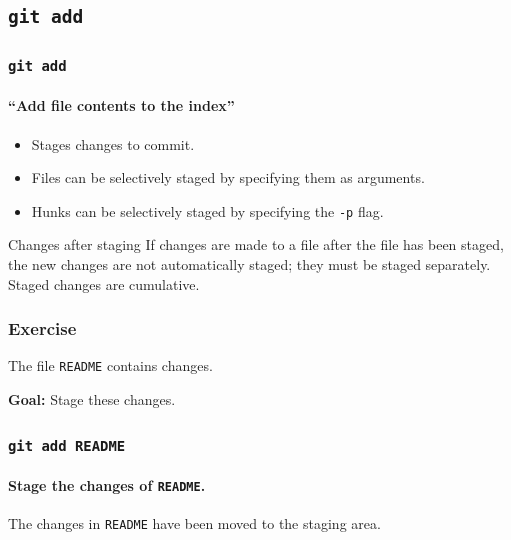 \documentclass{beamer}
\newcommand\gitcmd[1]{\texttt{git #1}}
\newcommand\gflag[1]{\texttt{#1}}
\newcommand\goal[1]{\textbf{Goal:} #1}
\begin{document}
\subsection{\gitcmd{add}}

\begin{frame}
  \frametitle{\gitcmd{add}}
  \framesubtitle{``Add file contents to the index''}
  \begin{itemize}
    \item Stages changes to commit.
    \item Files can be selectively staged by specifying them as arguments.
    \item Hunks can be selectively staged by specifying the \gflag{-p} flag.
  \end{itemize}
  \vfill
  \begin{block}{Changes after staging}
    If changes are made to a file after the file has been staged, the new changes are not automatically staged; they must be staged separately. Staged changes are cumulative.
  \end{block}
\end{frame}

\begin{frame}
  \frametitle{Exercise}
  The file \texttt{README} contains changes.

  \goal{Stage these changes.}

  \begin{figure}
    \centering
  \end{figure}
\end{frame}

\begin{frame}
  \frametitle{\gitcmd{add README}}
  \framesubtitle{Stage the changes of \texttt{README}.}
  \begin{figure}
    \centering
  \end{figure}
  The changes in \texttt{README} have been moved to the staging area.
\end{frame}
\end{document}
